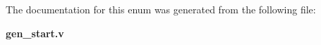 \subsubsection[{vsync\-\_\-detected}]{ {\bfseries \textcolor{vhdlchar}{ }} \hspace{0.3cm}}\label{enum1gen__start_ac7cdb3e30f9e8449f64f0ef0e7f95076}


The documentation for this enum was generated from the following file\-:\begin{DoxyCompactItemize}
\item 
{\bf gen\-\_\-start.\-v}\end{DoxyCompactItemize}
